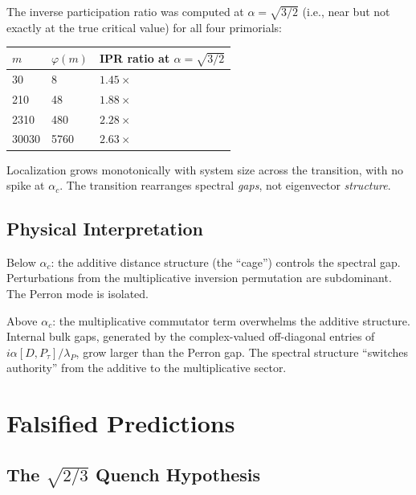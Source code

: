 \documentclass[11pt,letterpaper]{article}
\theoremstyle{definition}
\theoremstyle{remark}
\begin{document}
The inverse participation ratio was computed at $\alpha = \sqrt{3/2}$ (i.e., near but not exactly at the true critical value) for all four primorials:

\begin{longtable}[]{@{}lll@{}}
\toprule
$m$ & $\varphi(m)$ & IPR ratio at $\alpha = \sqrt{3/2}$ \\
\midrule
\endhead
\bottomrule
30 & 8 & $1.45\times$ \\
210 & 48 & $1.88\times$ \\
2310 & 480 & $2.28\times$ \\
30030 & 5760 & $2.63\times$ \\
\end{longtable}

Localization grows monotonically with system size across the transition, with no spike at $\alpha_c$. The transition rearranges spectral \emph{gaps}, not eigenvector \emph{structure}.

\subsection{Physical Interpretation}\label{physical-interpretation}

Below $\alpha_c$: the additive distance structure (the ``cage'') controls the spectral gap. Perturbations from the multiplicative inversion permutation are subdominant. The Perron mode is isolated.

Above $\alpha_c$: the multiplicative commutator term overwhelms the additive structure. Internal bulk gaps, generated by the complex-valued off-diagonal entries of $i\alpha[D,P_\tau]/\lambda_P$, grow larger than the Perron gap. The spectral structure ``switches authority'' from the additive to the multiplicative sector.

\section{Falsified Predictions}\label{falsified-predictions}

\subsection{The $\sqrt{2/3}$ Quench Hypothesis}\label{the-sqrt23-quench-hypothesis}
\end{document}
